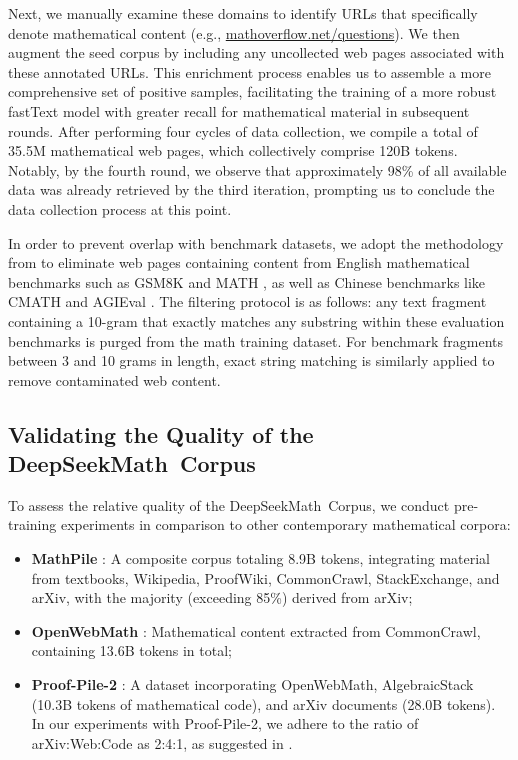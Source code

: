 Next, we manually examine these domains to identify URLs that specifically denote mathematical content (e.g., \url{mathoverflow.net/questions}). We then augment the seed corpus by including any uncollected web pages associated with these annotated URLs. This enrichment process enables us to assemble a more comprehensive set of positive samples, facilitating the training of a more robust fastText model with greater recall for mathematical material in subsequent rounds. After performing four cycles of data collection, we compile a total of 35.5M mathematical web pages, which collectively comprise 120B tokens. Notably, by the fourth round, we observe that approximately 98\% of all available data was already retrieved by the third iteration, prompting us to conclude the data collection process at this point.

In order to prevent overlap with benchmark datasets, we adopt the methodology from \cite{deepseek-coder} to eliminate web pages containing content from English mathematical benchmarks such as GSM8K \citep{gsm8k} and MATH \citep{MATH}, as well as Chinese benchmarks like CMATH \citep{wei2023cmath} and AGIEval \citep{agieval}. The filtering protocol is as follows: any text fragment containing a 10-gram that exactly matches any substring within these evaluation benchmarks is purged from the math training dataset. For benchmark fragments between 3 and 10 grams in length, exact string matching is similarly applied to remove contaminated web content.

\subsection{Validating the Quality of the DeepSeekMath~Corpus}

To assess the relative quality of the DeepSeekMath~Corpus, we conduct pre-training experiments in comparison to other contemporary mathematical corpora:

\begin{itemize}[topsep=0pt]
    \item \textbf{MathPile} \citep{mathpile}: A composite corpus totaling 8.9B tokens, integrating material from textbooks, Wikipedia, ProofWiki, CommonCrawl, StackExchange, and arXiv, with the majority (exceeding 85\%) derived from arXiv;
    \item \textbf{OpenWebMath} \citep{openwebmath}: Mathematical content extracted from CommonCrawl, containing 13.6B tokens in total;
    \item \textbf{Proof-Pile-2} \citep{llemma}: A dataset incorporating OpenWebMath, AlgebraicStack (10.3B tokens of mathematical code), and arXiv documents (28.0B tokens). In our experiments with Proof-Pile-2, we adhere to the ratio of arXiv:Web:Code as 2:4:1, as suggested in \cite{llemma}.
\end{itemize}

